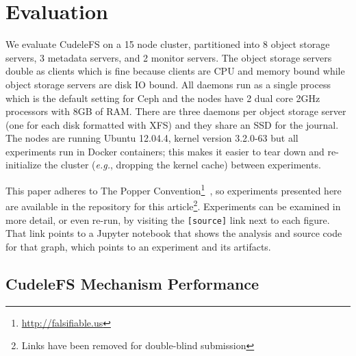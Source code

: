 \section{Evaluation}
\label{sec:evaluation}

We evaluate CudeleFS on a 15 node cluster, partitioned into 8 object storage
servers, 3 metadata servers, and 2 monitor servers. The object storage servers
double as clients which is fine because clients are CPU and memory bound while
object storage servers are disk IO bound. All daemons run as a single process
which is the default setting for Ceph and the nodes have 2 dual core 2GHz
processors with 8GB of RAM. There are three daemons per object storage server
(one for each disk formatted with XFS) and they share an SSD for the journal.
The nodes are running Ubuntu 12.04.4, kernel version 3.2.0-63 but all
experiments run in Docker containers; this makes it easier to tear down and
re-initialize the cluster ({\it e.g.}, dropping the kernel cache) between
experiments.

This paper adheres to The Popper
Convention\footnote{\url{http://falsifiable.us}}~\cite{jimenez_popper_2016}, so
experiments presented here are available in the repository for this
article\footnote{Links have been removed for double-blind submission}.
Experiments can be examined in more detail, or even re-run, by visiting the
\texttt{[source]} link next to each figure. That link points to a Jupyter
notebook that shows the analysis and source code for that graph, which points
to an experiment and its artifacts.


\subsection{CudeleFS Mechanism Performance}

